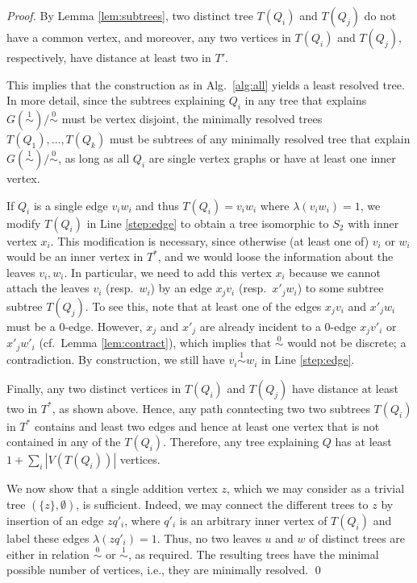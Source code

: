 \documentclass[smallextended]{svjour3}
\newcommand{\Ro}{\mathrel{\overset{0}{\sim}}}
\newcommand{\Rl}{\mathrel{\overset{1}{\sim}}}
\begin{document}
\begin{proof}
{  
  By Lemma \ref{lem:subtrees}, two distinct tree $T(Q_i)$ and $T(Q_j)$
	do not have a common vertex, and moreover, 
   any two vertices in  $T(Q_i)$ and $T(Q_j)$, respectively, 
	have distance at least two in $T'$. 

  This implies that the construction as in Alg.\ \ref{alg:all} yields a
  least resolved tree.  In more detail, since the subtrees explaining $Q_i$
  in any tree that explains $G(\Rl)/\Ro$ must be vertex disjoint, the
  minimally resolved trees $T(Q_1),\dots,T(Q_k)$ must be subtrees of any
  minimally resolved tree that explain $G(\Rl)/\Ro$, as long as all $Q_i$
  are single vertex graphs or have at least one inner vertex.

  If $Q_i$ is a single edge $v_iw_i$ and thus $T(Q_i) = v_iw_i$ where
  $\lambda(v_iw_i)=1$, we modify $T(Q_i)$ in Line \ref{step:edge} to obtain
  a tree isomorphic to $S_2$ with inner vertex $x_i$. This modification is
  necessary, since otherwise (at least one of) $v_i$ or $w_i$ would be an
  inner vertex in $T^*$, and we would loose the information about the
  leaves $v_i,w_i$. In particular, we need to add this vertex $x_i$ because
  we cannot attach the leaves $v_i$ (resp.\ $w_i$) by an edge $x_jv_i$
  (resp.\ $x'_jw_i$) to some subtree subtree $T(Q_j)$.  To see this, note
  that at least one of the edges $x_jv_i$ and $x'_jw_i$ must be a
  0-edge. However, $x_j$ and $x'_j$ are already incident to a 0-edge
  $x_jv'_i$ or $x'_jw'_i$ (cf.\ Lemma \ref{lem:contract}), which implies
  that $\Ro$ would not be discrete; a contradiction.  By construction, we
  still have $v_i\Rl w_i$ in Line \ref{step:edge}.
	
  Finally, any two distinct vertices in $T(Q_i)$ and $T(Q_j)$ have distance
  at least two in $T^*$, as shown above. Hence, any path conntecting two
  two subtrees $T(Q_i)$ in $T^*$ contains and least two edges and hence at
  least one vertex that is not contained in any of the $T(Q_i)$. Therefore,
  any tree explaining $Q$ has at least $1+\sum_i |V(T(Q_i))|$ vertices.

  We now show that a single addition vertex $z$, which we may consider as a
  trivial tree $(\{z\},\emptyset)$, is sufficient. Indeed, we may connect
  the different trees to $z$ by insertion of an edge $zq'_i$, where $q'_i$
  is an arbitrary inner vertex of $T(Q_i)$ and label these edges
  $\lambda(zq'_i)=1$.  Thus, no two leaves $u$ and $w$ of distinct trees
  are either in relation $\Ro$ or $\Rl$, as required. The resulting trees 
  have the minimal possible number of vertices, i.e., they are minimally
  resolved. 
  \qed}
\end{proof}
\end{document}
